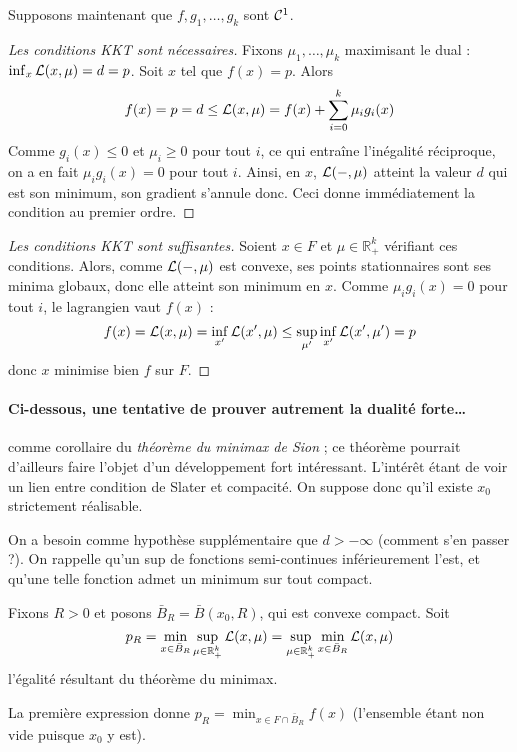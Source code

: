 \documentclass[a4paper, 11pt]{article}
\def\R{\mathbb{R}}
\def\L{{\cal{L}}}
\def\Cf{{\cal{C}}}
\begin{document}
Supposons maintenant que $f, g_1, \ldots, g_k$ sont $\Cf^1$. 
\begin{proof}[Les conditions KKT sont nécessaires]
  Fixons $\mu_1, \ldots, \mu_k$ maximisant le dual : $\inf_x \L(x, \mu) = d =
  p$. Soit $x$ tel que $f(x) = p$. Alors
  \[ f(x) = p = d \leq \L(x, \mu) = f(x) + \sum_{i=0}^k \mu_i g_i(x) \] Comme
  $g_i(x) \leq 0$ et $\mu_i \geq 0$ pour tout $i$, ce qui entraîne l'inégalité
  réciproque, on a en fait $\mu_i g_i(x) = 0$ pour tout $i$. Ainsi, en $x$,
  $\L(-, \mu)$ atteint la valeur $d$ qui est son minimum, son gradient s'annule
  donc. Ceci donne immédiatement la condition au premier ordre.
\end{proof}

\begin{proof}[Les conditions KKT sont suffisantes]
Soient $x \in F$ et $\mu \in \R_+^k$ vérifiant ces conditions. Alors, comme
$\L(-,\mu)$ est convexe, ses points stationnaires sont ses minima globaux, donc
elle atteint son minimum en $x$. Comme $\mu_i g_i(x) = 0$ pour tout $i$, le
lagrangien vaut $f(x)$ :
\[ f(x) = \L(x,\mu) = \inf_{x'} \L(x',\mu) \leq \sup_{\mu'} \inf_{x'}
  \L(x',\mu') = p
\]
donc $x$ minimise bien $f$ sur $F$.
\end{proof}

\paragraph{Ci-dessous, une tentative de prouver autrement la dualité forte…}
comme corollaire du \emph{théorème du minimax de Sion} ; ce théorème pourrait
d'ailleurs faire l'objet d'un développement fort intéressant. L'intérêt étant de
voir un lien entre condition de Slater et compacité. On suppose donc qu'il
existe $x_0$ strictement réalisable.

On a besoin comme hypothèse supplémentaire que $d > -\infty$ (comment s'en
passer ?). On rappelle qu'un sup de fonctions semi-continues inférieurement
l'est, et qu'une telle fonction admet un minimum sur tout compact.

Fixons $R > 0$ et posons $\bar{B}_R = \bar{B}(x_0,R)$, qui est convexe compact.
Soit
\[ p_R = \min_{x \in \bar{B}_R} \sup_{\mu \in \R_+^k} \L(x,\mu)
       = \sup_{\mu \in \R_+^k} \min_{x \in \bar{B}_R} \L(x,\mu) \]
l'égalité résultant du théorème du minimax.

La première expression donne $p_R = \min_{x \in F \cap \bar{B}_R} f(x)$
(l'ensemble étant non vide puisque $x_0$ y est).
\end{document}
